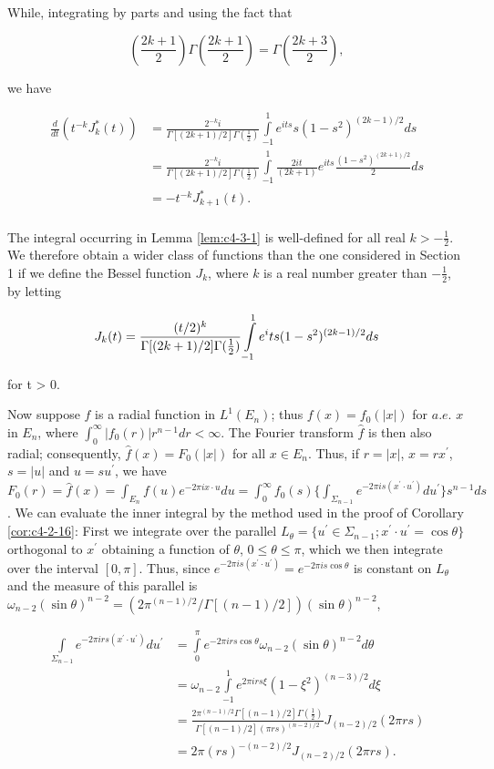 While, integrating by parts and using the fact that

\[
\left(\frac{2k+1}{2}\right)\Gamma\left(\frac{2k+1}{2}\right)=\Gamma\left(\frac{2k+3}{2}\right),
\]

we have

\[
\begin{aligned}\frac{d}{dt}(t^{-k}J^{*}_{k}(t))&=\frac{2^{-k}i}{\Gamma[(2k+1)/2]\Gamma(\frac{1}{2})}\int\limits_{-1}^{1}e^{its}s(1-s^{2})^{(2k-1)/2}ds\\&=\frac{2^{-k}i}{\Gamma[(2k+1)/2]\Gamma(\frac{1}{2})}\int\limits_{-1}^{1}\frac{2it}{(2k+1)}e^{its}\frac{(1-s^{2})^{(2k+1)/2}}{2}ds\\&=-t^{-k}J^{*}_{k+1}(t).\\ \end{aligned}
\]

The integral occurring in Lemma \ref{lem:c4-3-1} is well-defined for all real $k > -\frac{1}{2}$. We therefore obtain a wider class of functions than the one considered in Section 1 if we define the Bessel function $J_k$, where $k$ is a real number greater than $-\frac{1}{2}$, by letting

\[
J_{k}(t)=\frac{(t/2)^{k}}{\Gamma[(2k+1)/2]\Gamma(\frac{1}{2})} \intop_{-1}^{1}e^its(1-s^{2})^{(2k-1)/2} d s
\]

for t > 0.

Now suppose $f$ is a radial function in $L^{1}(E_{n})$; thus $f(x) = f_{0}(|x|)$ for $a.e.$ $x$ in $E_{n}$, where $\int_{0}^{\infty} |f_{0}(r)|r^{n-1}dr < \infty$. The Fourier transform $\hat{f}$ is then also radial; consequently, $\hat{f}(x) = F_{0}(|x|)$ for all $x \in E_{n}$. Thus, if $r = |x|$, $x = rx^{\prime}$, $s = |u|$ and $u = su^{\prime}$, we have $F_{0}(r) = \hat{f}(x) = \int_{E_{n}} f(u)e^{-2\pi i x \cdot u} du = \int_{0}^{\infty} f_{0}(s)\{\int_{\Sigma_{n-1}} e^{-2\pi i s(x^{\prime}\cdot u^{\prime})} du^{\prime}\}s^{n-1}ds$. We can evaluate the inner integral by the method used in the proof of Corollary \ref{cor:c4-2-16}: First we integrate over the parallel $L_{\theta} = \{u^{\prime} \in \Sigma_{n-1}; x^{\prime} \cdot u^{\prime} = \cos \theta\}$ orthogonal to $x^{\prime}$ obtaining a function of $\theta$, $0 \leq \theta \leq \pi$, which we then integrate over the interval $[0, \pi]$. Thus, since $e^{-2\pi i s(x^{\prime}\cdot u^{\prime})} = e^{-2\pi i s\cos\theta}$ is constant on $L_{\theta}$ and the measure of this parallel is $\omega_{n-2}(\sin \theta)^{n-2} = (2\pi^{(n-1)/2}/\Gamma[(n-1)/2]) (\sin \theta)^{n-2}$,

\[
\begin{aligned}\int\limits_{\Sigma_{n-1}}e^{-2\pi i r s(x^{\prime}\cdot u^{\prime})}du^{\prime}&=\int\limits_{0}^{\pi}e^{-2\pi i r s\cos\theta}\omega_{n-2}(\sin\theta)^{n-2}d\theta\\&=\omega_{n-2}\int\limits_{-1}^{1}e^{2\pi i r s\xi}(1-\xi^{2})^{(n-3)/2}d\xi\\&=\frac{2\pi^{(n-1)/2}\Gamma[(n-1)/2]\Gamma(\frac{1}{2})}{\Gamma[(n-1)/2](\pi r s)^{(n-2)/2}}J_{(n-2)/2}(2\pi r s)\\&=2\pi(r s)^{-(n-2)/2}J_{(n-2)/2}(2\pi r s).\end{aligned}
\]

